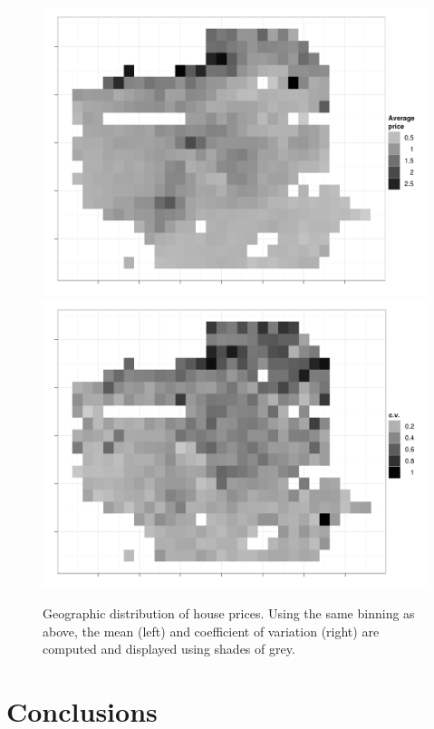 \documentclass[oneside]{article}
\begin{document}
\begin{figure}[htbp]
  \centering
    \includegraphics[width=0.5\linewidth]{sf-bin-price}%
    \includegraphics[width=0.5\linewidth]{sf-bin-cv}
  \caption{Geographic distribution of house prices.  Using the same binning as above, the mean (left) and coefficient of variation (right) are computed and displayed using shades of grey.}
  \label{fig:sf-price}
\end{figure}


\section{Conclusions}

\end{document}
